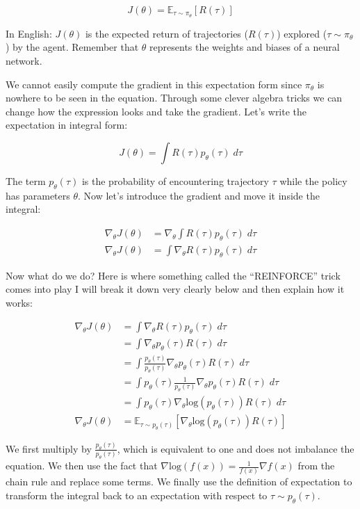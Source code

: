     $$J(\theta) = \mathbb{E}_{\tau \sim \pi_\theta}[R(\tau)]$$

    In English: $J(\theta)$ is the expected return of trajectories ($R(\tau)$) explored ($\tau \sim \pi_\theta$) by the agent. Remember that $\theta$ represents the weights and biases of a neural network. 
    
    We cannot easily compute the gradient in this expectation form since $\pi_\theta$ is nowhere to be seen in the equation. Through some clever algebra tricks we can change how the expression looks and take the gradient. Let's write the expectation in integral form: 

    $$J(\theta) = \int R(\tau)p_{\theta}(\tau)\;d\tau$$

    The term $p_\theta(\tau)$ is the probability of encountering trajectory $\tau$ while the policy has parameters $\theta$. Now let's introduce the gradient and move it inside the integral:

    \begin{align*}
        \nabla_\theta J(\theta) &= \nabla_\theta\int R(\tau)p_{\theta}(\tau)\;d\tau \\
        \nabla_\theta J(\theta) &= \int \nabla_\theta R(\tau)p_{\theta}(\tau)\;d\tau
    \end{align*}
    
    Now what do we do? Here is where something called the ``REINFORCE'' trick comes into play I will break it down very clearly below and then explain how it works:

    \begin{align*}
        \nabla_\theta J(\theta) &= \int \nabla_\theta R(\tau)p_{\theta}(\tau)\;d\tau \\
        &= \int \nabla_\theta p_{\theta}(\tau)R(\tau)\;d\tau \\
        &= \int \frac{p_{\theta}(\tau)}{p_{\theta}(\tau)}\nabla_\theta p_{\theta}(\tau) R(\tau)\;d\tau \\
        &= \int p_{\theta}(\tau)\frac{1}{p_{\theta}(\tau)}\nabla_\theta p_{\theta}(\tau) R(\tau)\;d\tau \\
        &= \int p_{\theta}(\tau) \nabla_\theta \mathrm{log}(p_\theta(\tau)) R(\tau)\;d\tau \\
        \nabla_\theta J(\theta) &= \mathbb{E}_{\tau \sim p_\theta(\tau)}[\nabla_\theta \mathrm{log}(p_\theta(\tau)) R(\tau)] 
    \end{align*}

    We first multiply by $\frac{p_{\theta}(\tau)}{p_{\theta}(\tau)}$, which is equivalent to one and does not imbalance the equation. We then use the fact that $\nabla \mathrm{log}(f(x)) = \frac{1}{f(x)}\nabla f(x)$ from the chain rule and replace some terms. We finally use the definition of expectation to transform the integral back to an expectation with respect to $\tau \sim p_\theta(\tau)$. 

